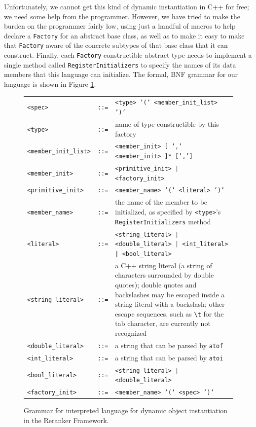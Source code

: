 \documentclass[a4paper]{article}
\providecommand{\tabularnewline}{\\}
\begin{document}
Unfortunately, we cannot get this kind of dynamic instantiation in
C++ for free; we need some help from the programmer. However, we have
tried to make the burden on the programmer fairly low, using just
a handful of macros to help declare a \texttt{Factory} for an abstract
base class, as well as to make it easy to make that \texttt{Factory}
aware of the concrete subtypes of that base class that it can construct.
Finally, each \texttt{Factory}-constructible abstract type needs to
implement a single method called \texttt{RegisterInitializers} to
specify the names of its data members that this language can initialize.
The formal, BNF grammar for our language is shown in Figure \ref{fig:bnf-grammar}.
\begin{figure}
\scriptsize
\center
\begin{tabular}{ll>{\raggedright}p{9cm}}
\texttt{<spec>} & \texttt{::=} & \texttt{<type> '(' <member\_init\_list> ')'}\tabularnewline
\texttt{<type>} & \texttt{::=} & name of type constructible by this factory\tabularnewline
\texttt{<member\_init\_list>} & \texttt{::=} & \texttt{<member\_init> {[} ',' <member\_init> {]}{*} {[}','{]}}\tabularnewline
\texttt{<member\_init>} & \texttt{::=} & \texttt{<primitive\_init> | <factory\_init>}\tabularnewline
\texttt{<primitive\_init>} & \texttt{::=} & \texttt{<member\_name> '(' <literal> ')'}\tabularnewline
\texttt{<member\_name>} & \texttt{::=} & the name of the member to be initialized, as specified by \texttt{<type>}\textquoteright{}s
\texttt{RegisterInitializers} method\tabularnewline
\texttt{<literal>} & \texttt{::=} & \texttt{<string\_literal> | <double\_literal> | <int\_literal> | <bool\_literal>}\tabularnewline
\texttt{<string\_literal>} & \texttt{::=} & a C++ string literal (a string of characters surrounded by double
quotes); double quotes and backslashes may be escaped inside a string
literal with a backslash; other escape sequences, such as \texttt{\textbackslash{}t}
for the tab character, are currently not recognized\tabularnewline
\texttt{<double\_literal>} & \texttt{::=} & a string that can be parsed by \texttt{atof}\tabularnewline
\texttt{<int\_literal>} & \texttt{::=} & a string that can be parsed by \texttt{atoi}\tabularnewline
\texttt{<bool\_literal>} & \texttt{::=} & \texttt{<string\_literal> | <double\_literal>}\tabularnewline
\texttt{<factory\_init>} & \texttt{::=} & \texttt{<member\_name> '(' <spec> ')'}\tabularnewline
\end{tabular}

\caption{\label{fig:bnf-grammar}Grammar for interpreted language for dynamic
object instantiation in the Reranker Framework.}
\end{figure}
\end{document}
